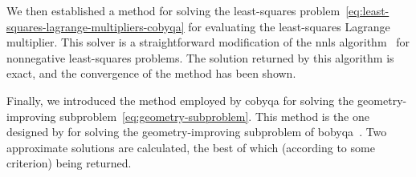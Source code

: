 We then established a method for solving the least-squares problem~\cref{eq:least-squares-lagrange-multipliers-cobyqa} for evaluating the least-squares Lagrange multiplier.
This solver is a straightforward modification of the \gls{nnls} algorithm~\cite[Alg.~(23.10)]{Lawson_Hanson_1987} for nonnegative least-squares problems.
The solution returned by this algorithm is exact, and the convergence of the method has been shown.

Finally, we introduced the method employed by \gls{cobyqa} for solving the geometry-improving subproblem~\cref{eq:geometry-subproblem}.
This method is the one designed by \citeauthor{Powell_2009} for solving the geometry-improving subproblem of \gls{bobyqa}~\cite{Powell_2009}.
Two approximate solutions are calculated, the best of which (according to some criterion) being returned.
